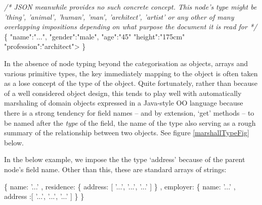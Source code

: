 \documentclass[]{article}
\newenvironment{Shaded}{}{}
\newcommand{\DataTypeTok}[1]{\textcolor[rgb]{0.56,0.13,0.00}{{#1}}}
\newcommand{\StringTok}[1]{\textcolor[rgb]{0.25,0.44,0.63}{{#1}}}
\newcommand{\CommentTok}[1]{\textcolor[rgb]{0.38,0.63,0.69}{\textit{{#1}}}}
\newcommand{\NormalTok}[1]{{#1}}
\begin{document}
\begin{Shaded}
\begin{Highlighting}[]
\CommentTok{/*    JSON meanwhile provides no such concrete concept. This node's}
\CommentTok{      type might be 'thing', 'animal', 'human', 'man', 'architect',}
\CommentTok{      'artist' or any other of many overlapping impositions depending }
\CommentTok{      on what purpose the document it is read for */}
\NormalTok{\{  }\StringTok{"name"}\NormalTok{:}\StringTok{"..."}\NormalTok{, }\StringTok{"gender"}\NormalTok{:}\StringTok{"male"}\NormalTok{, }\StringTok{"age"}\NormalTok{:}\StringTok{"45"} 
   \StringTok{"height"}\NormalTok{:}\StringTok{"175cm"} \StringTok{"profession"}\NormalTok{:}\StringTok{"architect"}\NormalTok{>}
\NormalTok{\}         }
\end{Highlighting}
\end{Shaded}

In the absence of node typing beyond the categorisation as objects,
arrays and various primitive types, the key immediately mapping to the
object is often taken as a lose concept of the type of the object. Quite
fortunately, rather than because of a well considered object design,
this tends to play well with automatically marshaling of domain objects
expressed in a Java-style OO language because there is a strong tendency
for field names -- and by extension, `get' methods -- to be named after
the \emph{type} of the field, the name of the type also serving as a
rough summary of the relationship between two objects. See figure
\ref{marshallTypeFig} below.

In the below example, we impose the the type `address' because of the
parent node's field name. Other than this, these are standard arrays of
strings:

\begin{Shaded}
\begin{Highlighting}[]
\NormalTok{\{}
   \DataTypeTok{name}\NormalTok{: }\StringTok{'...'}
\NormalTok{,  }\DataTypeTok{residence}\NormalTok{: \{}
      \DataTypeTok{address}\NormalTok{: [}
         \StringTok{'...'}\NormalTok{, }\StringTok{'...'}\NormalTok{, }\StringTok{'...'}
      \NormalTok{]}
   \NormalTok{\}}
\NormalTok{,  }\DataTypeTok{employer}\NormalTok{: \{}
      \DataTypeTok{name}\NormalTok{: }\StringTok{'...'}
   \NormalTok{,  }\DataTypeTok{address }\NormalTok{:[}
         \StringTok{'...'}\NormalTok{, }\StringTok{'...'}\NormalTok{, }\StringTok{'...'}      
      \NormalTok{]}
   \NormalTok{\}   }
\NormalTok{\}}
\end{Highlighting}
\end{Shaded}
\end{document}
